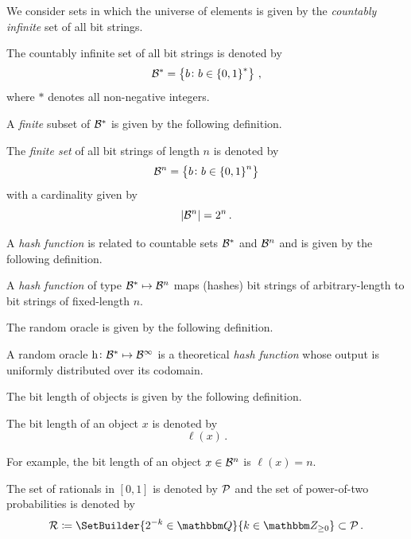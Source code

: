 \documentclass[11pt,final,hidelinks]{article}
\newcommand{\BL}{\ell}  %
\begin{document}
We consider sets in which the universe of elements is given by the \emph{countably infinite} set of all bit strings.
\begin{definition}
The countably infinite set of all bit strings is denoted by
\begin{equation}
    \BitSet^* = \left\{b \colon b \in \left\{0,1\right\}^*\right\}\,,
\end{equation}
where $*$ denotes all non-negative integers.
\end{definition}
A \emph{finite} subset of $\BitSet^*$ is given by the following definition.
\begin{definition}
The \emph{finite set} of all bit strings of length $n$ is denoted by
\begin{equation}
    \BitSet^n = \left\{b \colon b \in \left\{0,1\right\}^n\right\}
\end{equation}
with a cardinality given by
\begin{equation}
    \Card{\BitSet^n} = 2^n\,.
\end{equation}
\end{definition}

A \emph{hash function} is related to countable sets $\BitSet^*$ and $\BitSet^n$ and is given by the following definition.
\begin{definition}
A \emph{hash function} of type $\BitSet^* \mapsto \BitSet^n$ maps (hashes) bit strings of arbitrary-length to bit strings of fixed-length $n$.
\end{definition}

The random oracle is given by the following definition.
\begin{definition}
\label{def:randomoracle}
A random oracle $\hash \colon \BitSet^* \mapsto \BitSet^{\infty}$ is a theoretical \emph{hash function} whose output is uniformly distributed over its codomain.
\end{definition}

The bit length of objects is given by the following definition.
\begin{definition}
The bit length of an object $x$ is denoted by
\begin{equation}
    \BL(x)\,.
\end{equation}
\end{definition}
For example, the bit length of an object $x \in \BitSet^n$ is $\BL(x) = n$.

The set of rationals in $[0,1]$ is denoted by $\FancySet{P}$ and the set of power-of-two probabilities is denoted by
\begin{equation}
	\FancySet{R} \coloneqq \SetBuilder{2^{-k} \in \RatSet}{k \in \IntSet_{\geq 0}} \subset \FancySet{P}\,.
\end{equation}
\end{document}
